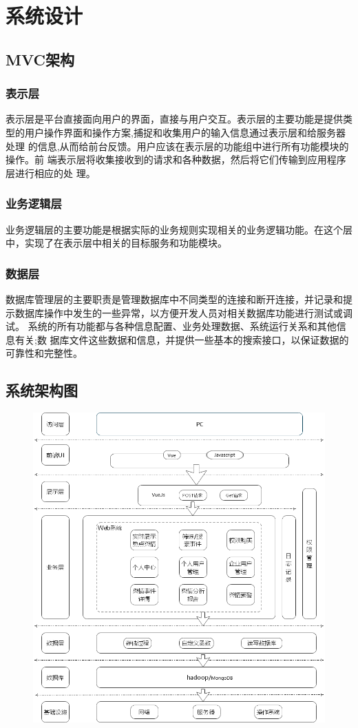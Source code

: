 \section{系统设计}
\subsection{MVC架构}
\subsubsection{表示层}
表示层是平台直接面向用户的界面，直接与用户交互。表示层的主要功能是提供类
型的用户操作界面和操作方案,捕捉和收集用户的输入信息通过表示层和给服务器处理
的信息,从而给前台反馈。用户应该在表示层的功能组中进行所有功能模块的操作。前
端表示层将收集接收到的请求和各种数据，然后将它们传输到应用程序层进行相应的处
理。
\subsubsection{业务逻辑层}
业务逻辑层的主要功能是根据实际的业务规则实现相关的业务逻辑功能。在这个层
中，实现了在表示层中相关的目标服务和功能模块。

\subsubsection{数据层}
数据库管理层的主要职责是管理数据库中不同类型的连接和断开连接，并记录和提
示数据库操作中发生的一些异常，以方便开发人员对相关数据库功能进行测试或调试。
系统的所有功能都与各种信息配置、业务处理数据、系统运行关系和其他信息有关;数
据库文件这些数据和信息，并提供一些基本的搜索接口，以保证数据的可靠性和完整性。


\subsection{系统架构图}

\begin{figure}[!htbp]
	\centering
	\includegraphics[scale=0.6]{image/a1.png}
\end{figure}